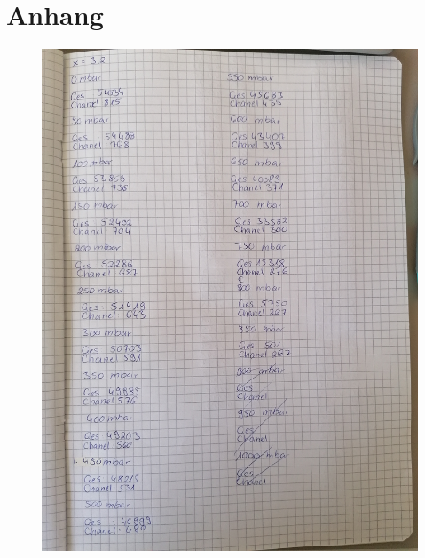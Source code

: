 \section{Anhang}
\label{sec:Anhang}

\begin{figure}
\centering
\includegraphics[width=\textwidth]{content/Anhang 1.jpg}
\end{figure}

